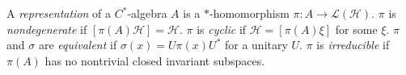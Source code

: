 A \emph{representation} of a $C^*$-algebra $A$ is a $\ast$-homomorphism $\pi: A \to \mathcal{L}(\mathcal{H})$. $\pi$ is \emph{nondegenerate} if $[\pi(A)\mathcal{H}] = \mathcal{H}$. $\pi$ is \emph{cyclic} if $\mathcal{H} = [\pi(A)\xi]$ for some $\xi$. $\pi$ and $\sigma$ are \emph{equivalent} if $\sigma(x) = U\pi(x)U^*$ for a unitary $U$. $\pi$ is \emph{irreducible} if $\pi(A)$ has no nontrivial closed invariant subspaces.
